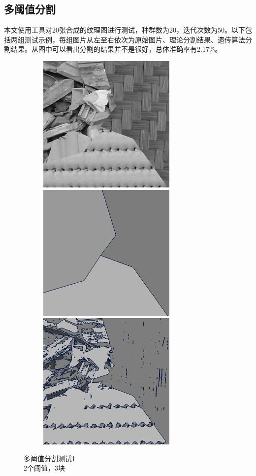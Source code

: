 \documentclass[11pt,a4paper,titlepage]{article}
\begin{document}
\subsection{多阈值分割}

本文使用工具\cite{benchmark}对20张合成的纹理图进行测试，种群数为20，迭代次数为50。以下包括两组测试示例，每组图片从左至右依次为原始图片、理论分割结果、遗传算法分割结果。从图中可以看出分割的结果并不是很好，总体准确率有2.17\%。

\begin{figure}[!htb]
  \begin{subfigure}{\linewidth}
  \includegraphics[width=.3\linewidth]{mosaic11.png}\hfill
  \includegraphics[width=.3\linewidth]{mosaic12.png}\hfill
  \includegraphics[width=.3\linewidth]{mosaic13.png}
  \end{subfigure}\par\medskip
  \caption{多阈值分割测试1\\
  2个阈值，3块}
\end{figure}
\end{document}
